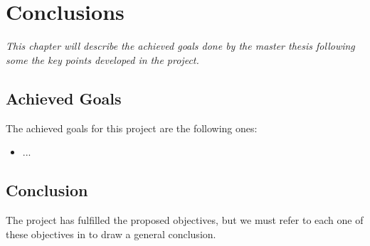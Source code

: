 \chapter{Conclusions}
\label{chap:conclusions}
\textit{This chapter will describe the achieved goals done by the master thesis following some the key points developed in the project.}

\clearpage
\section{Achieved Goals}

The achieved goals for this project are the following ones:

\begin{itemize}
    \item ...
\end{itemize}

\clearpage
\section{Conclusion}
\label{sec:conclusion}

The project has fulfilled the proposed objectives, but we must refer to each one of these objectives in to draw a general conclusion.

